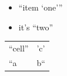 \documentclass[11pt]{article}
\author{Au}
\date{2026-01-01}
\title{}
\begin{document}
\tableofcontents

\begin{itemize}
\item ``item `one'''
\item it's ``two''
\end{itemize}

\begin{center}
\begin{tabular}{ll}
``cell'' & 'c'\\[0pt]
``a & b``\\[0pt]
\end{tabular}
\end{center}
\end{document}
